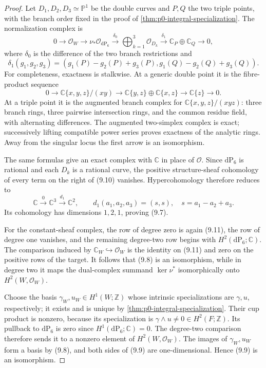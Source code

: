 \begin{proof}
Let \(D_1,D_2,D_3\simeq\mathbb P^1\) be the double curves and \(P,Q\) the
two triple points, with the branch order fixed in the proof of
\cref{thm:p0-integral-specialization}.  The normalization complex is
\[
0\longrightarrow\mathcal O_W\longrightarrow
 \nu_*\mathcal O_{\mathrm{dP}_6}\xrightarrow{\delta_0}
 \bigoplus_{k=1}^3\mathcal O_{D_k}\xrightarrow{\delta_1}
 \mathbb C_P\oplus\mathbb C_Q\longrightarrow0,
\tag{9.10}
\]
where \(\delta_0\) is the difference of the two branch restrictions and
\[
 \delta_1(g_1,g_2,g_3)
 =(g_1(P)-g_2(P)+g_3(P),
   g_1(Q)-g_2(Q)+g_3(Q)).
\]
For completeness, exactness is stalkwise.  At a generic double point it is
the fibre-product sequence
\[
0\to\mathbb C\{x,y,z\}/(xy)
 \to\mathbb C\{y,z\}\oplus\mathbb C\{x,z\}
 \to\mathbb C\{z\}\to0.
\]
At a triple point it is the augmented branch complex for
\(\mathbb C\{x,y,z\}/(xyz)\): three branch rings, three pairwise
intersection rings, and the common residue field, with alternating
differences.  The augmented two-simplex complex is exact; successively
lifting compatible power series proves exactness of the analytic rings.
Away from the singular locus the first arrow is an isomorphism.

The same formulas give an exact complex with \(\mathbb C\) in place of
\(\mathcal O\).  Since \(\mathrm{dP}_6\) is rational and each \(D_k\) is a
rational curve, the positive structure-sheaf cohomology of every term on
the right of (9.10) vanishes.  Hypercohomology therefore reduces to
\[
 \mathbb C\xrightarrow{0}\mathbb C^3
 \xrightarrow{d_1}\mathbb C^2,
 \qquad
 d_1(a_1,a_2,a_3)=(s,s),\quad s=a_1-a_2+a_3.
\tag{9.11}
\]
Its cohomology has dimensions \(1,2,1\), proving (9.7).

For the constant-sheaf complex, the row of degree zero is again (9.11),
the row of degree one vanishes, and the remaining degree-two row begins
with \(H^2(\mathrm{dP}_6;\mathbb C)\).  The comparison induced by
\(\mathbb C_W\hookrightarrow\mathcal O_W\) is the identity on (9.11) and
zero on the positive rows of the target.  It follows that (9.8) is an
isomorphism, while in degree two it maps the dual-complex summand
\(\ker\nu^*\) isomorphically onto \(H^2(W,\mathcal O_W)\).

Choose the basis \(\gamma_W,u_W\in H^1(W;\mathbb Z)\) whose intrinsic
specializations are \(\gamma,u\), respectively; it exists and is unique by
\cref{thm:p0-integral-specialization}.  Their cup product is nonzero,
because its specialization is
\(\gamma\wedge u\ne0\in H^2(F;\mathbb Z)\).  Its pullback to
\(\mathrm{dP}_6\) is zero since
\(H^1(\mathrm{dP}_6;\mathbb C)=0\).  The degree-two comparison therefore
sends it to a nonzero element of \(H^2(W,\mathcal O_W)\).  The images of
\(\gamma_W,u_W\) form a basis by (9.8), and both sides of (9.9) are
one-dimensional.  Hence (9.9) is an isomorphism.
\end{proof}

